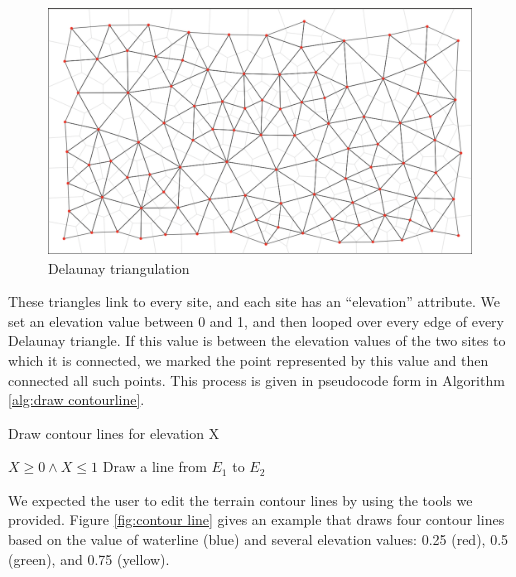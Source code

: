 \begin{figure}[htbp]
  \includegraphics[width=\textwidth]{section04/assets/Map-delaunay-triangulation.png}
  \caption{Delaunay triangulation}
  \label{fig:Delaunay triangulation}
\end{figure}

These triangles link to every site, and each site has an ``elevation'' attribute. We set an elevation value between 0 and 1, and then looped over every edge of every Delaunay triangle. If this value is between the elevation values of the two sites to which it is connected, we marked the point represented by this value and then connected all such points. This process is given in pseudocode form in Algorithm \ref{alg:draw contourline}.

\begin{algorithm}
\caption{Draw contour lines for elevation X}
\label{alg:draw contourline}
\begin{algorithmic}
\REQUIRE $X \geq 0 \wedge X \leq 1$
\STATE Draw a line from $E_1$ to $E_2$
\ENDIF
\ENDFOR
\ENDFOR
\end{algorithmic}
\end{algorithm}

We expected the user to edit the terrain contour lines by using the tools we provided. Figure \ref{fig:contour line} gives an example that draws four contour lines based on the value of waterline (blue) and several elevation values: 0.25 (red), 0.5 (green), and 0.75 (yellow).

